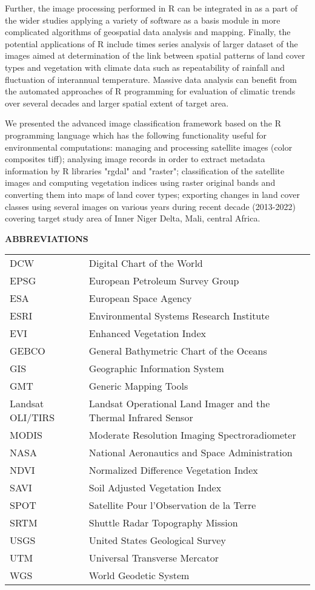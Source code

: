 \documentclass[12pt,a4paper,oneside]{article}
\def \newsection{\vspace{12pt}\textbf}
\def \newpar{\vspace{6pt}}
\begin{document}
\newpar Further, the image processing performed in R can be integrated in as a part of the wider studies applying a variety of software as a basis module in more complicated algorithms of geospatial data analysis and mapping. Finally, the potential applications of R include times series analysis of larger dataset of the images aimed at determination of the link between spatial patterns of land cover types and vegetation with climate data such as repeatability of rainfall and fluctuation of interannual temperature. Massive data analysis can benefit from the automated approaches of R programming for evaluation of climatic trends over several decades and larger spatial extent of target area.

\newpar We presented the advanced image classification framework based on the R programming language which has the following functionality useful for environmental computations: managing and processing satellite images (color composites tiff); analysing image records in order to extract metadata information by R libraries "rgdal" and "raster"; classification of the satellite images and computing vegetation indices using raster original bands  and converting them into maps of land cover types; exporting changes in land cover classes using several images on various years during recent decade (2013-2022) covering target study area of Inner Niger Delta, Mali, central Africa.

\vspace{12pt}

\newsection {ABBREVIATIONS}
\vspace{12pt}

\begin{tabular}{@{}ll}
DCW & Digital Chart of the World \\
EPSG & European Petroleum Survey Group \\
ESA & European Space Agency \\
ESRI & Environmental Systems Research Institute \\
EVI & Enhanced Vegetation Index \\
GEBCO & General Bathymetric Chart of the Oceans \\
GIS & Geographic Information System \\
GMT & Generic Mapping Tools \\
Landsat OLI/TIRS & Landsat Operational Land Imager and the Thermal Infrared Sensor \\
MODIS & Moderate Resolution Imaging Spectroradiometer \\
NASA & National Aeronautics and Space Administration \\
NDVI & Normalized Difference Vegetation Index \\
SAVI & Soil Adjusted Vegetation Index \\
SPOT & Satellite Pour l'Observation de la Terre \\
SRTM & Shuttle Radar Topography Mission \\
USGS & United States Geological Survey \\
UTM & Universal Transverse Mercator \\
WGS & World Geodetic System \\
\end{tabular}
\end{document}
